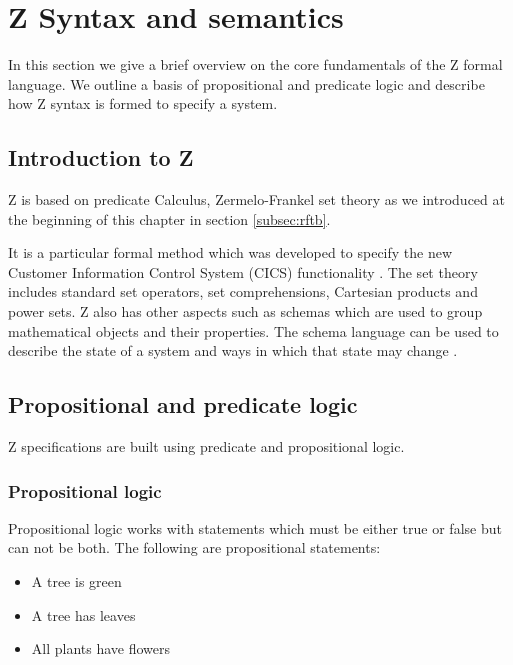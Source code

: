 \section{Z Syntax and semantics}
\label{sec:theznotation}

In this section we give a brief overview on the core fundamentals of the Z formal language. We outline a basis of propositional and predicate logic and describe how Z syntax is formed to specify a system.

\subsection{Introduction to Z}


Z is based on predicate Calculus, Zermelo-Frankel set theory as we introduced at the beginning of this chapter in section \ref{subsec:rftb}.

It is a particular formal method which was developed to specify the new Customer Information Control System (CICS) functionality \cite{cics}. The set theory includes standard set operators, set comprehensions, Cartesian products and power sets. Z also has other aspects such as schemas which are used to group mathematical objects and their properties. The schema language can be used to describe the state of a system and ways in which that state may change \cite{Woodcock:1996:UZS:235337}.

\subsection{Propositional and predicate logic}

Z specifications are built using predicate and propositional logic.

\subsubsection{Propositional logic}

Propositional logic works with statements which must be either true or false but can not be both. The following are propositional statements:
\begin{itemize}
\item A tree is green

\item A tree has leaves

\item All plants have flowers
\end{itemize}

